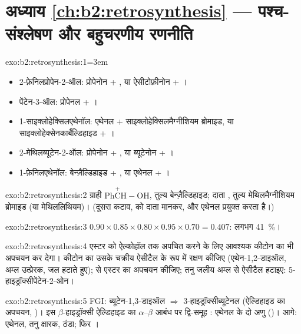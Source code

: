 \section*{अध्याय \ref{ch:b2:retrosynthesis} --- पश्च-संश्लेषण और बहुचरणीय रणनीति}

\begin{solution}{exo:b2:retrosynthesis:1}\emergencystretch=3em
\begin{itemize}
  \item 2-फ़ेनिलप्रोपेन-2-ऑल: प्रोपेनोन + , या ऐसीटोफ़ीनोन + ।
  \item पेंटेन-3-ऑल: प्रोपेनल + ।
  \item 1-साइक्लोहेक्सिलएथेनॉल: एथेनल + साइक्लोहेक्सिलमैग्नीशियम ब्रोमाइड, या साइक्लोहेक्सेनकार्बैल्डिहाइड +
        ।
  \item 2-मेथिलब्यूटेन-2-ऑल: प्रोपेनोन + , या ब्यूटेनोन + ।
  \item 1-फ़ेनिलएथेनॉल: बेन्ज़ैल्डिहाइड + , या एथेनल + ।
\end{itemize}
\end{solution}

\begin{solution}{exo:b2:retrosynthesis:2}
ग्राही  $\mathrm{Ph\overset{+}{C}H{-}OH}$, तुल्य बेन्ज़ैल्डिहाइड; दाता  ,
तुल्य मेथिलमैग्नीशियम ब्रोमाइड (या मेथिललिथियम)। (दूसरा कटाव,  को दाता मानकर,
 और एथेनल प्रयुक्त करता है।)
\end{solution}

\begin{solution}{exo:b2:retrosynthesis:3}
$0.90 \times 0.85 \times 0.80 \times 0.95 \times 0.70 = 0.407$: लगभग 41~\%।
\end{solution}

\begin{solution}{exo:b2:retrosynthesis:4}
एस्टर को ऐल्कोहॉल तक अपचित करने के लिए आवश्यक  कीटोन का भी अपचयन कर देगा। कीटोन का
उसके चक्रीय ऐसीटैल के रूप में रक्षण कीजिए (एथेन-1,2-डाइऑल, अम्ल उत्प्रेरक, जल हटाते हुए);  से
एस्टर का अपचयन कीजिए; तनु जलीय अम्ल से ऐसीटैल हटाइए: 5-हाइड्रॉक्सीपेंटेन-2-ओन।
\end{solution}

\begin{solution}{exo:b2:retrosynthesis:5}
FGI: ब्यूटेन-1,3-डाइऑल $\Rightarrow$ 3-हाइड्रॉक्सीब्यूटेनल (ऐल्डिहाइड का अपचयन, )। इस $\beta$-हाइड्रॉक्सी ऐल्डिहाइड का
$\alpha$--$\beta$ आबंध पर द्वि-समूह : एथेनल के दो अणु
()। आगे: एथेनल, तनु क्षारक, ठंडा; फिर ।
\end{solution}

